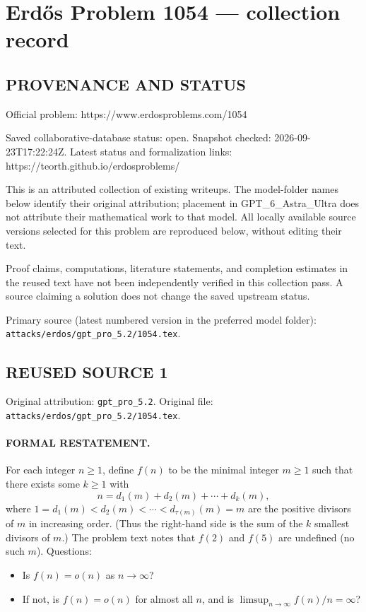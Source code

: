 \section*{Erd\H{o}s Problem 1054 --- collection record}

\subsection*{PROVENANCE AND STATUS}
Official problem: https://www.erdosproblems.com/1054

Saved collaborative-database status: open.
Snapshot checked: 2026-09-23T17:22:24Z.
Latest status and formalization links: https://teorth.github.io/erdosproblems/

This is an attributed collection of existing writeups. The model-folder names below identify their original attribution; placement in GPT\_6\_Astra\_Ultra does not attribute their mathematical work to that model. All locally available source versions selected for this problem are reproduced below, without editing their text.

Proof claims, computations, literature statements, and completion estimates in the reused text have not been independently verified in this collection pass. A source claiming a solution does not change the saved upstream status.

Primary source (latest numbered version in the preferred model folder): \texttt{attacks/erdos/gpt\_pro\_5.2/1054.tex}.

\subsection*{REUSED SOURCE 1}
Original attribution: \texttt{gpt\_pro\_5.2}.
Original file: \texttt{attacks/erdos/gpt\_pro\_5.2/1054.tex}.


\paragraph{FORMAL RESTATEMENT.}
For each integer $n\ge 1$, define $f(n)$ to be the minimal integer $m\ge 1$ such that there exists some $k\ge 1$ with
\[
n = d_1(m)+d_2(m)+\cdots + d_k(m),
\]
where $1=d_1(m)<d_2(m)<\cdots<d_{\tau(m)}(m)=m$ are the positive divisors of $m$ in increasing order.
(Thus the right-hand side is the sum of the $k$ smallest divisors of $m$.)
The problem text notes that $f(2)$ and $f(5)$ are undefined (no such $m$).
Questions:
\begin{itemize}
\item Is $f(n)=o(n)$ as $n\to\infty$?
\item If not, is $f(n)=o(n)$ for almost all $n$, and is $\limsup_{n\to\infty} f(n)/n=\infty$?
\end{itemize}

